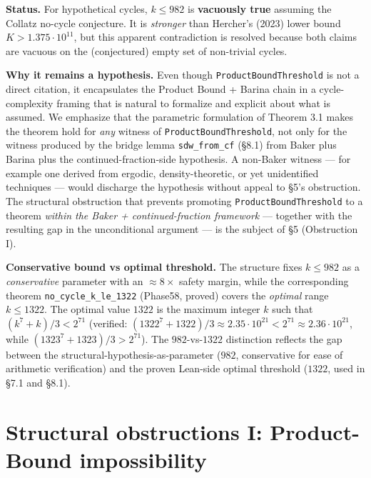\documentclass[
  11pt]{amsart}
\theoremstyle{plain}
\theoremstyle{definition}
\theoremstyle{remark}
\begin{document}
\textbf{Status.} For hypothetical cycles, \(k \leq 982\) is
\textbf{vacuously true} assuming the Collatz no-cycle conjecture. It is
\emph{stronger} than Hercher's (2023) lower bound
\(K > 1.375 \cdot 10^{11}\), but this apparent contradiction is resolved
because both claims are vacuous on the (conjectured) empty set of
non-trivial cycles.

\textbf{Why it remains a hypothesis.} Even though
\texttt{ProductBoundThreshold} is not a direct citation, it encapsulates
the Product Bound + Barina chain in a cycle-complexity framing that is
natural to formalize and explicit about what is assumed. We emphasize
that the parametric formulation of Theorem 3.1 makes the theorem hold
for \emph{any} witness of \texttt{ProductBoundThreshold}, not only for
the witness produced by the bridge lemma \texttt{sdw\_from\_cf} (§8.1)
from Baker plus Barina plus the continued-fraction-side hypothesis. A
non-Baker witness --- for example one derived from ergodic,
density-theoretic, or yet unidentified techniques --- would discharge
the hypothesis without appeal to §5's obstruction. The structural
obstruction that prevents promoting \texttt{ProductBoundThreshold} to a
theorem \emph{within the Baker + continued-fraction framework} ---
together with the resulting gap in the unconditional argument --- is the
subject of §5 (Obstruction I).

\textbf{Conservative bound vs optimal threshold.} The structure fixes
\(k \leq 982\) as a \emph{conservative} parameter with an
\(\approx 8\times\) safety margin, while the corresponding theorem
\texttt{no\_cycle\_k\_le\_1322} (Phase58, proved) covers the
\emph{optimal} range \(k \leq 1322\). The optimal value \(1322\) is the
maximum integer \(k\) such that \((k^7 + k)/3 < 2^{71}\) (verified:
\((1322^7 + 1322)/3 \approx 2.35 \cdot 10^{21} < 2^{71} \approx
2.36 \cdot 10^{21}\), while \((1323^7 + 1323)/3 > 2^{71}\)). The
\(982\)-vs-\(1322\) distinction reflects the gap between the
structural-hypothesis-as-parameter (\(982\), conservative for ease of
arithmetic verification) and the proven Lean-side optimal threshold
(\(1322\), used in §7.1 and §8.1).

\section{Structural obstructions I: Product-Bound
impossibility}\label{structural-obstructions-i-product-bound-impossibility}
\end{document}
